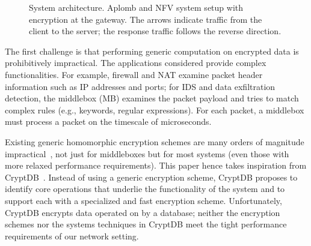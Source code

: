 \begin{figure}[t!]
\centering
{}
%
\hfill  
{}
     
\caption{System architecture. Aplomb and NFV system setup with \sys encryption  at the gateway. The arrows indicate traffic from the client to the server; the response traffic follows the reverse direction. \label{fig:sys-overview}}
\end{figure}


    
The first challenge is that performing generic computation on encrypted data is prohibitively impractical. The applications considered provide complex functionalities. For example, firewall and NAT examine packet header information such as IP addresses and ports; for IDS and data exfiltration detection, the middlebox (MB) examines the packet payload and tries to match complex rules (e.g., keywords, regular expressions). For each packet, a middlebox must process a packet on the timescale of microseconds. 

Existing generic homomorphic encryption schemes are many orders of magnitude impractical~\cite{gentry:fhe-aes-eprint}, not just for middleboxes but for most systems (even those with more relaxed performance requirements).
This paper hence takes inspiration from CryptDB~\cite{CryptDB}. Instead of using a generic encryption scheme, CryptDB proposes to identify core operations that underlie the functionality of the system and to support each with a specialized and fast encryption scheme. 
Unfortunately, CryptDB encrypts data operated on by a database; neither the encryption schemes nor the systems techniques in CryptDB meet the tight performance requirements of our network setting.

